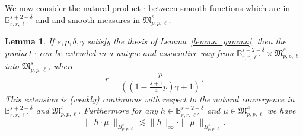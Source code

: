 \documentclass[a4paper,10pt]{article}
\newtheorem{lemma}[theorem]{Lemma}
\begin{document}
We now consider the natural product $\cdot$ between smooth functions which
are in $\mathbb{B}^{s + 2 - \delta}_{r, r, \ell'}$ and and smooth measures in
$\mathfrak{M}^s_{p, p, \ell}$.

\begin{lemma}
  \label{lemma_multiplication}If $s, p, \delta, \gamma$ satisfy the thesis of
  Lemma~\ref{lemma_gamma}, then the product $\cdot$ can be extended in a
  unique and associative way from $\mathbb{B}^{s + 2 - \delta}_{r, r, \ell'}
  \times \mathfrak{M}^s_{p, p, \ell}$ into $\mathfrak{M}^s_{p, p, \ell}$,
  where
  \[ r = \frac{p}{\left( \left( 1 - \frac{s + 1}{4} p \right) \gamma + 1
     \right)} . \]
  This extension is (weakly) continuous with respect to the natural
  convergence in $\mathbb{B}^{s + 2 - \delta}_{r, r, \ell'}$ and
  $\mathfrak{M}^s_{p, p, \ell}$. Furthermore for any $h \in \mathbb{B}^{s + 2
  - \delta}_{r, r, \ell'}$ and $\mu \in \mathfrak{M}^s_{p, p, \ell}$ we have
  \begin{equation}
    \| | h \cdot \mu | \|_{B^s_{p, p, \ell}} \lesssim \| h \|_{\infty} \cdot
    \| | \mu | \|_{B^s_{p, p, \ell}} . \label{eq:exponentialmain1}
  \end{equation}
\end{lemma}
\end{document}
